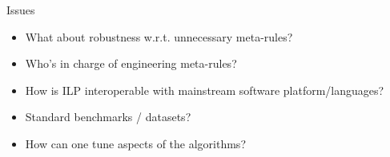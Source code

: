 \documentclass[presentation]{beamer}\mode<presentation>{\usetheme{AMSBolognaFC}}
\begin{document}
\begin{frame}{Issues}
    \begin{itemize}
        \item What about robustness w.r.t. \alert{unnecessary meta-rules}?
        \item Who's in charge of \alert{engineering meta-rules}?
        \item How is ILP \alert{interoperable} with mainstream software platform/languages?
        \item Standard \alert{benchmarks / datasets}?
        \item How can one \alert{tune aspects} of the algorithms?
    \end{itemize}
\end{frame}

\section*{}

\frame{\titlepage}

\section*{\refname}

\begin{frame}{\refname}
    \scriptsize
    \nocite{*}
    
    
\end{frame}

\end{document}
